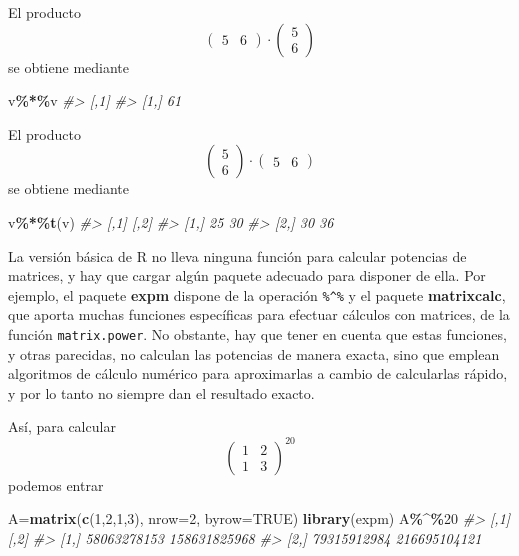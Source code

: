 \documentclass[
]{book}
\newenvironment{Shaded}{\begin{snugshade}}{\end{snugshade}}
\newcommand{\CommentTok}[1]{\textcolor[rgb]{0.56,0.35,0.01}{\textit{#1}}}
\newcommand{\DataTypeTok}[1]{\textcolor[rgb]{0.13,0.29,0.53}{#1}}
\newcommand{\DecValTok}[1]{\textcolor[rgb]{0.00,0.00,0.81}{#1}}
\newcommand{\KeywordTok}[1]{\textcolor[rgb]{0.13,0.29,0.53}{\textbf{#1}}}
\newcommand{\NormalTok}[1]{#1}
\newcommand{\OperatorTok}[1]{\textcolor[rgb]{0.81,0.36,0.00}{\textbf{#1}}}
\newcommand{\OtherTok}[1]{\textcolor[rgb]{0.56,0.35,0.01}{#1}}
\theoremstyle{definition}
\theoremstyle{definition}
\theoremstyle{definition}
\theoremstyle{remark}
\begin{document}
El producto
\[
\left(\begin{array}{cc}
5 & 6\end{array}\right)\cdot \left(\begin{array}{c}
5\\ 6\end{array}
\right)
\]
se obtiene mediante

\begin{Shaded}
\begin{Highlighting}[]
\NormalTok{v}\OperatorTok{\%*\%}\NormalTok{v}
\CommentTok{\#\textgreater{}      [,1]}
\CommentTok{\#\textgreater{} [1,]   61}
\end{Highlighting}
\end{Shaded}

El producto
\[
\left(\begin{array}{c}
5\\ 6\end{array}
\right)\cdot
\left(\begin{array}{cc}
5 & 6\end{array}\right) 
\]
se obtiene mediante

\begin{Shaded}
\begin{Highlighting}[]
\NormalTok{v}\OperatorTok{\%*\%}\KeywordTok{t}\NormalTok{(v)}
\CommentTok{\#\textgreater{}      [,1] [,2]}
\CommentTok{\#\textgreater{} [1,]   25   30}
\CommentTok{\#\textgreater{} [2,]   30   36}
\end{Highlighting}
\end{Shaded}

La versión básica de R no lleva ninguna función para calcular potencias de matrices,
y hay que cargar algún paquete adecuado para disponer de ella. Por ejemplo,
el paquete \textbf{expm} dispone de la operación \texttt{\%\^{}\%} y el paquete \textbf{matrixcalc}, que aporta muchas funciones específicas para efectuar cálculos con matrices, de la función \texttt{matrix.power}. No obstante, hay que tener en cuenta que estas funciones, y otras parecidas, no calculan las potencias de manera exacta, sino que emplean algoritmos de cálculo numérico para aproximarlas a cambio de calcularlas rápido, y por lo tanto no siempre dan el resultado exacto.

Así, para calcular
\[
\left(\begin{array}{cc}
1 & 2 \\ 1 & 3\end{array}
\right)^{20}
\]
podemos entrar

\begin{Shaded}
\begin{Highlighting}[]
\NormalTok{A=}\KeywordTok{matrix}\NormalTok{(}\KeywordTok{c}\NormalTok{(}\DecValTok{1}\NormalTok{,}\DecValTok{2}\NormalTok{,}\DecValTok{1}\NormalTok{,}\DecValTok{3}\NormalTok{), }\DataTypeTok{nrow=}\DecValTok{2}\NormalTok{, }\DataTypeTok{byrow=}\OtherTok{TRUE}\NormalTok{)}
\KeywordTok{library}\NormalTok{(expm)}
\NormalTok{A}\OperatorTok{\%\^{}\%}\DecValTok{20} 
\CommentTok{\#\textgreater{}             [,1]         [,2]}
\CommentTok{\#\textgreater{} [1,] 58063278153 158631825968}
\CommentTok{\#\textgreater{} [2,] 79315912984 216695104121}
\end{Highlighting}
\end{Shaded}
\end{document}
